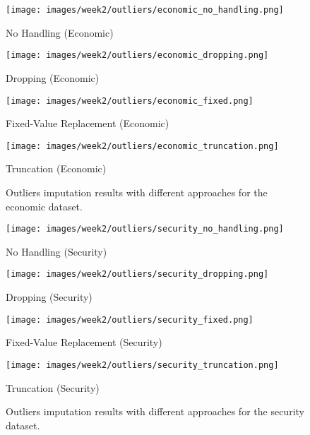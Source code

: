 \begin{figure}[H]
    \centering
    \begin{minipage}{0.48\textwidth}
        \centering
        \texttt{[image: images/week2/outliers/economic\_no\_handling.png]}
        \caption*{No Handling (Economic)}
    \end{minipage}
    \begin{minipage}{0.48\textwidth}
        \centering
        \texttt{[image: images/week2/outliers/economic\_dropping.png]}
        \caption*{Dropping (Economic)}
    \end{minipage}
    \vspace{0.3cm}
    \begin{minipage}{0.48\textwidth}
        \centering
        \texttt{[image: images/week2/outliers/economic\_fixed.png]}
        \caption*{Fixed-Value Replacement (Economic)}
    \end{minipage}
    \begin{minipage}{0.48\textwidth}
        \centering
        \texttt{[image: images/week2/outliers/economic\_truncation.png]}
        \caption*{Truncation (Economic)}
    \end{minipage}
    \caption{Outliers imputation results with different approaches for the economic dataset.}
\end{figure}

\begin{figure}[H]
    \centering
    \begin{minipage}{0.48\textwidth}
        \centering
        \texttt{[image: images/week2/outliers/security\_no\_handling.png]}
        \caption*{No Handling (Security)}
    \end{minipage}
    \begin{minipage}{0.48\textwidth}
        \centering
        \texttt{[image: images/week2/outliers/security\_dropping.png]}
        \caption*{Dropping (Security)}
    \end{minipage}
    \vspace{0.3cm}
    \begin{minipage}{0.48\textwidth}
        \centering
        \texttt{[image: images/week2/outliers/security\_fixed.png]}
        \caption*{Fixed-Value Replacement (Security)}
    \end{minipage}
    \begin{minipage}{0.48\textwidth}
        \centering
        \texttt{[image: images/week2/outliers/security\_truncation.png]}
        \caption*{Truncation (Security)}
    \end{minipage}
    \caption{Outliers imputation results with different approaches for the security dataset.}
\end{figure}